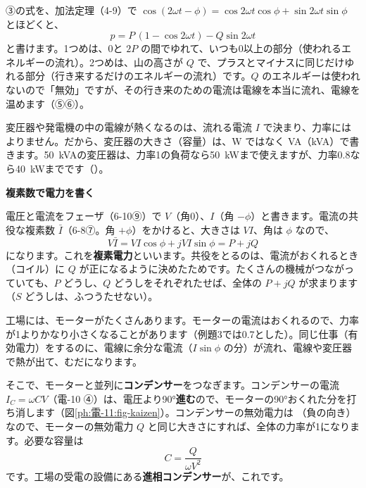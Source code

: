 ③の式を、加法定理（4-9）で $\cos(2\omega t-\phi)=\cos2\omega t\cos\phi+\sin2\omega t\sin\phi$ とほどくと、
\[p=P\,(1-\cos2\omega t)-Q\sin2\omega t\]
と書けます。1つめは、0と $2P$ の間でゆれて、いつも0以上の部分（使われるエネルギーの流れ）。2つめは、山の高さが $Q$ で、プラスとマイナスに同じだけゆれる部分（行き来するだけのエネルギーの流れ）です。$Q$ のエネルギーは使われないので「無効」ですが、その行き来のための電流は電線を本当に流れ、電線を温めます（⑤⑥）。

変圧器や発電機の中の電線が熱くなるのは、流れる電流 $I$ で決まり、力率にはよりません。だから、変圧器の大きさ（容量）は、W ではなく VA（kVA）で書きます。\qty{50}{kVA}の変圧器は、力率1の負荷なら\qty{50}{kW}まで使えますが、力率0.8なら\qty{40}{kW}までです（）。

\begin{motto}[4]
\textbf{複素数で電力を書く}\par
電圧と電流をフェーザ（6-10⑨）で $V$（角0）、$I$（角 $-\phi$）と書きます。電流の共役な複素数 $\bar I$（6-8⑦。角 $+\phi$）をかけると、大きさは $VI$、角は $\phi$ なので、
\[V\bar I=VI\cos\phi+jVI\sin\phi=P+jQ\]
になります。これを\textbf{複素電力}といいます。共役をとるのは、電流がおくれるとき（コイル）に $Q$ が正になるように決めたためです。たくさんの機械がつながっていても、$P$ どうし、$Q$ どうしをそれぞれたせば、全体の $P+jQ$ が求まります（$S$ どうしは、ふつうたせない）。
\end{motto}

\label{ph:電-11:sec5}
工場には、モーターがたくさんあります。モーターの電流はおくれるので、力率が1よりかなり小さくなることがあります（例題3では0.7とした）。同じ仕事（有効電力）をするのに、電線に余分な電流（$I\sin\phi$ の分）が流れ、電線や変圧器で熱が出て、むだになります。

そこで、モーターと並列に\textbf{コンデンサー}をつなぎます。コンデンサーの電流 $I_C=\omega CV$（電-10 ④）は、電圧より90°\textbf{進む}ので、モーターの90°おくれた分を打ち消します（図\ref{ph:電-11:fig-kaizen}）。コンデンサーの無効電力は
（負の向き）なので、モーターの無効電力 $Q$ と同じ大きさにすれば、全体の力率が1になります。必要な容量は
\[C=\frac{Q}{\omega V^2}\]
です。工場の受電の設備にある\textbf{進相コンデンサー}が、これです。


